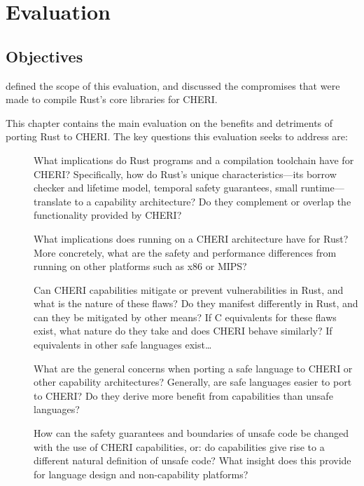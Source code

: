 \documentclass[dissertation.tex]{subfiles}
\begin{document}
\chapter{Evaluation}
\label{ch:eval}

\section{Objectives}
 defined the scope of this evaluation, and
discussed the compromises that were made to compile Rust's core
libraries for CHERI.

This chapter contains the main evaluation on the benefits and detriments
of porting Rust to CHERI.
The key questions this evaluation seeks to address are:

\begin{description}
    \item[] What implications do Rust programs and a
    compilation toolchain have for CHERI?
    Specifically, how do Rust's unique characteristics---its borrow
    checker and lifetime model, temporal safety guarantees, small
    runtime---translate to a capability architecture?
    Do they complement or overlap the functionality provided by CHERI?
    \item[] What implications does running on a
    CHERI architecture have for Rust?
    More concretely, what are the safety and performance differences
    from running on other platforms such as x86 or MIPS?
    \item[] Can CHERI capabilities mitigate or prevent
    vulnerabilities in Rust, and what is the nature of these flaws?
    Do they manifest differently in Rust, and can they be mitigated by
    other means?
    If C equivalents for these flaws exist, what nature do they take and
    does CHERI behave similarly? 
    If equivalents in other safe languages exist\ldots
    \item[] What are the general concerns when
    porting a safe language to CHERI or other capability architectures?
    Generally, are safe languages easier to port to CHERI? Do they
    derive more benefit from capabilities than unsafe languages?
    \item[] How can the safety guarantees
    and boundaries of unsafe code be changed with the use of CHERI
    capabilities, or: do capabilities give rise to a different natural
    definition of unsafe code?
    What insight does this provide for language design and
    non-capability platforms?
\end{description}
\end{document}
